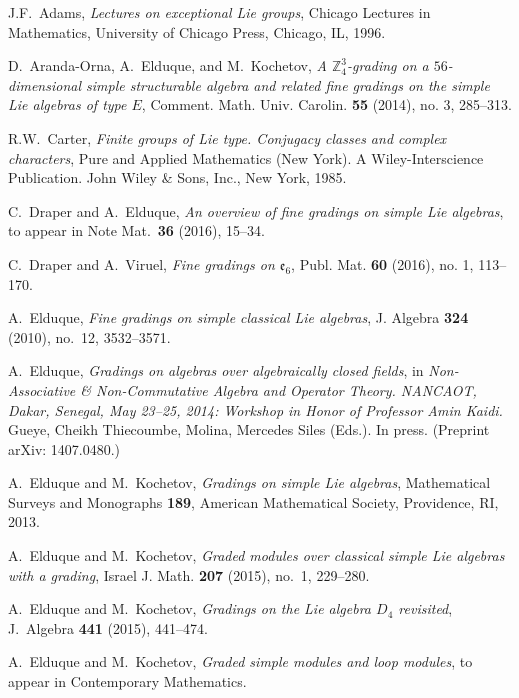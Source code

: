 \documentclass[a4paper,reqno]{amsart}
\theoremstyle{definition}
\numberwithin{theorem}{section}
\numberwithin{equation}{section}
\begin{document}
\begin{thebibliography}{ABFP08}

J.F.~Adams, \emph{Lectures on exceptional Lie groups}, Chicago Lectures in Mathematics, University of Chicago Press, Chicago, IL, 1996.

 D.~Aranda-Orna, A.~Elduque, and M.~Kochetov, \emph{A ${\mathbb{Z}}_4^3$-grading on a $56$-dimensional simple structurable algebra and related fine gradings on the simple Lie algebras of type $E$}, Comment. Math. Univ. Carolin. \textbf{55} (2014), no. 3, 285--313.

R.W.~Carter, \emph{Finite groups of {L}ie type. {C}onjugacy classes and complex characters}, Pure and Applied Mathematics (New York). A Wiley-Interscience Publication. John Wiley \& Sons, Inc., New York, 1985. 

C.~Draper and A.~Elduque, \emph{An overview of fine gradings on simple {L}ie algebras}, to appear in Note Mat.~\textbf{36} (2016), 15--34. 

C.~Draper and A.~Viruel, \emph{Fine gradings on $\mathfrak{e}_6$}, Publ. Mat. \textbf{60} (2016), no. 1, 113--170.

A.~Elduque, \emph{Fine gradings on simple classical {L}ie algebras}, J. Algebra \textbf{324} (2010), no.~12, 3532--3571. 

A.~Elduque, \emph{Gradings on algebras over algebraically closed fields}, in \emph{Non-Associative \& Non-Commutative Algebra and Operator Theory.
NANCAOT, Dakar, Senegal, May 23--25, 2014: Workshop in Honor of Professor Amin Kaidi.}
Gueye, Cheikh Thiecoumbe, Molina, Mercedes Siles (Eds.). In press. (Preprint arXiv: 1407.0480.)

A.~Elduque and M.~Kochetov, \emph{Gradings on simple {L}ie algebras}, Mathematical Surveys and Monographs \textbf{189},  American Mathematical Society, Providence, RI, 2013.

A.~Elduque and M.~Kochetov, \emph{Graded modules over classical simple Lie algebras with a grading}, Israel J. Math. \textbf{207} (2015), no.~1, 229--280.

A.~Elduque and M.~Kochetov, \emph{Gradings on the Lie algebra $D_4$ revisited}, J.~Algebra \textbf{441} (2015), 441--474.

A.~Elduque and M.~Kochetov, \emph{Graded simple modules and loop modules}, to appear in Contemporary Mathematics.


\end{thebibliography}
\end{document}
